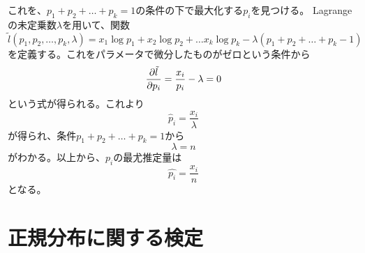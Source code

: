 これを、\(p_1 + p_2 + \dots + p_k = 1\)の条件の下で最大化する\(p_i\)を見つける。
Lagrangeの未定乗数\(\lambda\)を用いて、関数
\begin{equation}
  \tilde{l}(p_1, p_2, \dots, p_k, \lambda)
  = x_1 \log p_1 + x_2 \log p_2 + \dots x_k \log p_k - \lambda (p_1 + p_2 + \dots + p_k - 1)
\end{equation}
を定義する。これをパラメータで微分したものがゼロという条件から
\begin{equation}
  \pdv{\tilde{l}}{p_i} = \frac{x_i}{p_i} - \lambda = 0
\end{equation}
という式が得られる。これより
\begin{equation}
  \hat{p}_i = \frac{x_i}{\lambda}
\end{equation}
が得られ、条件\(p_1 + p_2 + \dots + p_k = 1\)から
\begin{equation}
  \lambda = n
\end{equation}
がわかる。以上から、\(p_i\)の最尤推定量は
\begin{equation}
  \hat{p_i} = \frac{x_i}{n}
\end{equation}
となる。

\section{正規分布に関する検定}

